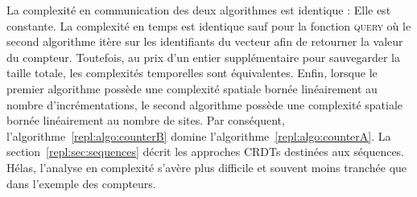 La complexité en communication des deux algorithmes est identique : Elle est
constante. La complexité en temps est identique sauf pour la fonction
\textsc{query} où le second algorithme itère sur les identifiants du vecteur
afin de retourner la valeur du compteur. Toutefois, au prix d'un entier
supplémentaire pour sauvegarder la taille totale, les complexités temporelles
sont équivalentes. Enfin, lorsque le premier algorithme possède une complexité
spatiale bornée linéairement au nombre d'incrémentations, le second algorithme
possède une complexité spatiale bornée linéairement au nombre de sites. Par
conséquent, l'algorithme~\ref{repl:algo:counterB} domine
l'algorithme~\ref{repl:algo:counterA}. La section~\ref{repl:sec:sequences}
décrit les approches CRDTs destinées aux séquences. Hélas, l'analyse en
complexité s'avère plus difficile et souvent moins tranchée que dans l'exemple
des compteurs.

